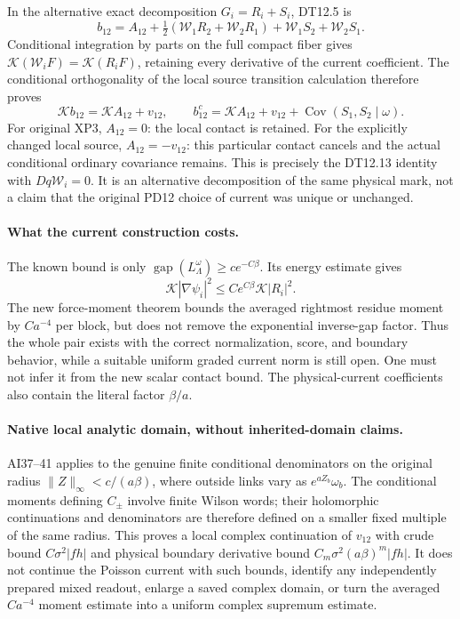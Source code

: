 \documentclass[11pt]{article}
\newcommand{\Cov}{\operatorname{Cov}}
\begin{document}
In the alternative exact decomposition $G_i=R_i+S_i$, DT12.5 is
\[
 b_{12}=A_{12}+\tfrac12(\mathcal W_1R_2+\mathcal W_2R_1)
                 +\mathcal W_1S_2+\mathcal W_2S_1.
\]
Conditional integration by parts on the full compact fiber gives
$\mathcal K(\mathcal W_iF)=\mathcal K(R_iF)$, retaining every derivative of the
current coefficient. The conditional orthogonality of the local source transition calculation therefore proves
\[
 \mathcal K b_{12}=\mathcal K A_{12}+v_{12},\qquad
 b^c_{12}=\mathcal K A_{12}+v_{12}+\Cov(S_1,S_2\mid\omega).
\]
For original XP3, $A_{12}=0$: the local contact is retained.
For the explicitly changed local source, $A_{12}=-v_{12}$: this particular contact cancels
and the actual conditional ordinary covariance remains. This is precisely the DT12.13
identity with $Dq\mathcal W_i=0$. It is an alternative decomposition of the same physical
mark, not a claim that the original PD12 choice of current was unique or unchanged.

\paragraph{What the current construction costs.}
The known bound is only $\operatorname{gap}(L^\omega_\Lambda)\ge c e^{-C\beta}$.
Its energy estimate gives
\[
 \mathcal K|\nabla\psi_i|^2\le Ce^{C\beta}\mathcal K|R_i|^2.
\]
The new force-moment theorem bounds the averaged rightmost residue moment by $Ca^{-4}$
per block, but does not remove the exponential inverse-gap factor. Thus the whole pair
exists with the correct normalization, score, and boundary behavior, while a suitable
uniform graded current norm is still open. One must not infer it from the new scalar
contact bound. The physical-current coefficients also contain the literal factor $\beta/a$.

\paragraph{Native local analytic domain, without inherited-domain claims.}
AI37--41 applies to the genuine finite conditional denominators on the original radius
$\|Z\|_\infty<c/(a\beta)$, where outside links vary as $e^{aZ_b}\omega_b$.
The conditional moments defining $C_\pm$ involve finite Wilson words; their holomorphic
continuations and denominators are therefore defined on a smaller fixed multiple of the
same radius. This proves a local complex continuation of $v_{12}$ with crude bound
$C\sigma^2|f h|$ and physical boundary derivative bound
$C_m\sigma^2(a\beta)^m|f h|$. It does not continue the Poisson current with such bounds,
identify any independently prepared mixed readout, enlarge a saved complex domain, or turn
the averaged $Ca^{-4}$ moment estimate into a uniform complex supremum estimate.
\end{document}
